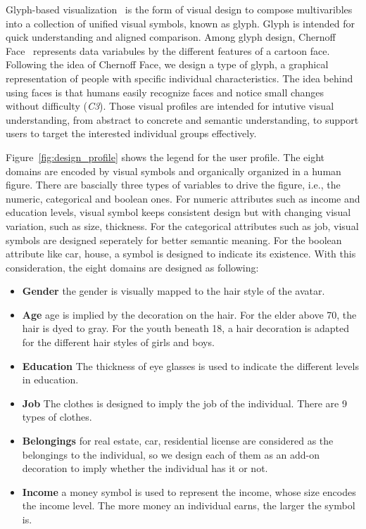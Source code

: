 Glyph-based visualization~\cite{borgo2013glyph} is the form of visual design to compose multivaribles into a collection of unified visual symbols, known as glyph. Glyph is intended for quick understanding and aligned comparison. Among glyph design, Chernoff Face~\cite{chernoff1973use} represents data variabules by the different features of a cartoon face. Following the idea of Chernoff Face, we design a type of glyph, a graphical representation of people with specific individual characteristics. The idea behind using faces is that humans easily recognize faces and notice small changes without difficulty (\textit{C3}). Those visual profiles are intended for intutive visual understanding, from abstract to concrete and semantic understanding, to support users to target the interested individual groups effectively.

Figure~\ref{fig:design_profile} shows the legend for the user profile. The eight domains are encoded by visual symbols and organically organized in a human figure. There are bascially three types of variables to drive the figure, i.e., the numeric, categorical and boolean ones. For numeric attributes such as income and education levels, visual symbol keeps consistent design but with changing visual variation, such as size, thickness. For the categorical attributes such as job, visual symbols are designed seperately for better semantic meaning. For the boolean attribute like car, house, a symbol is designed to indicate its existence. With this consideration, the eight domains are designed as following:



\begin{itemize}
\item \textbf{Gender} the gender is visually mapped to the hair style of the avatar. 
\item \textbf{Age} age is implied by the decoration on the hair. For the elder above 70, the hair is dyed to gray. For the youth beneath 18, a hair decoration is adapted for the different hair styles of girls and boys.
\item \textbf{Education} The thickness of eye glasses is used to indicate the different levels in education.
\item \textbf{Job} The clothes is designed to imply the job of the individual. There are 9 types of clothes.
\item \textbf{Belongings} for real estate, car, residential license are considered as the belongings to the individual, so we design each of them as an add-on decoration to imply whether the individual has it or not.
\item \textbf{Income} a money symbol is used to represent the income, whose size encodes the income level. The more money an individual earns, the larger the symbol is.
\end{itemize} 

